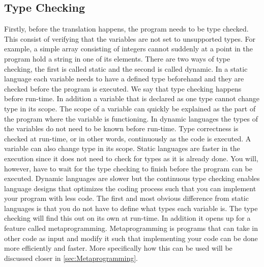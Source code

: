 \subsection{Type Checking}
Firstly, before the translation happens, the program needs to be type checked. This consist of verifying that the variables are not set to unsupported types. For example, a simple array consisting of integers cannot suddenly at a point in the program hold a string in one of its elements. There are two ways of type checking, the first is called static and the second is called dynamic. In a static language each variable needs to have a defined type beforehand and they are checked before the program is executed. We say that type checking happens before run-time. In addition a variable that is declared as one type cannot change type in its scope. The scope of a variable can quickly be explained as the part of the program where the variable is functioning. In dynamic languages the types of the variables do not need to be known before run-time. Type correctness is checked at run-time, or in other words, continuously as the code is executed. A variable can also change type in its scope. Static languages are faster in the execution since it does not need to check for types as it is already done. You will, however, have to wait for the type checking to finish before the program can be executed. Dynamic languages are slower but the continuous type checking enables language designs that optimizes the coding process such that you can implement your program with less code. The first and most obvious difference from static languages is that you do not have to define what types each variable is. The type checking will find this out on its own at run-time. In addition it opens up for a feature called metaprogramming. Metaprogramming is programs that can take in other code as input and modify it such that implementing your code can be done more efficiently and faster. More specifically how this can be used will be discussed closer in \autoref{sec:Metaprogramming}.

